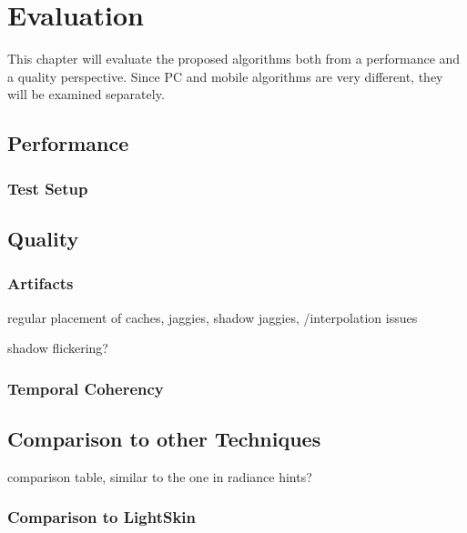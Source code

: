 \documentclass[thesis.tex]{subfiles}
\begin{document}
\chapter{Evaluation}\label{chap:eva}
This chapter will evaluate the proposed algorithms both from a performance and a quality perspective. Since PC and mobile algorithms are very different, they will be examined separately.

\section{Performance}

\subsection{Test Setup}

\newpage

\section{Quality}

\subsection{Artifacts}

regular placement of caches, jaggies,
shadow jaggies,
/interpolation issues

shadow flickering?


\subsection{Temporal Coherency}


\section{Comparison to other Techniques} \label{sec:eva:comparisiontoother}

comparison table, similar to the one in radiance hints?

\subsection{Comparison to LightSkin}

\subfilebib %
\end{document}
